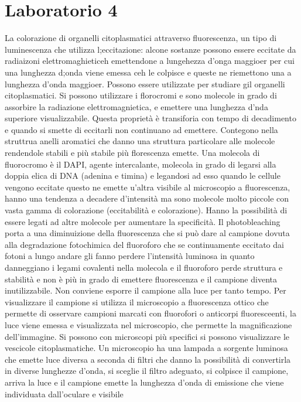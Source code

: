 \section{Laboratorio 4}
La colorazione di organelli citoplasmatici attraverso fluorescenza, un tipo di luminescenza che utilizza l;eccitazione: alcone sostanze possono essere eccitate da radiaizoni 
elettromaghieticeh emettendone a lungehezza d'onga maggioer per cui una lunghezza d;onda viene emessa ceh le colpisce e queste ne riemettono una a lunghezza d'onda maggioer. Possono
essere utilizzate per studiare gil organelli citoplasmatici. Si possono utilizzare i florocromi e sono molecole in grado di assorbire la radiazione elettromagnietica, e emettere una
lunghezza d'nda superiore visualizzabile. Questa propriet\`a \`e transiforia con tempo di decadimento e quando si smette di eccitarli non continuano ad emettere. Contegono nella
struttrua anelli aromatici che danno una struttura particolare alle molecole rendendole stabili e pi\`u stabile pi\`u florescenza emette. Una molecola di fluorocromo \`e il DAPI, agente
intercalante, molecola in grado di legarsi alla doppia elica di DNA (adenina e timina) e legandosi ad esso quando le cellule vengono eccitate questo ne emette u'altra visibile al 
microscopio a fluorescenza, hanno una tendenza a decadere d'intensit\`a ma sono molecole molto piccole con vasta gamma di colorazione (eccitabilit\`a e colorazione). Hanno la 
possibilit\`a di essere legati ad altre molecole per aumentare la specificit\`a. Il photobleaching porta a  una diminuizione della fluorescenza che si pu\`o dare al campione dovuta 
alla degradazione fotochimica del fluoroforo che se continuamente eccitato dai fotoni a lungo andare gli fanno perdere l'intensit\`a luminosa in quanto danneggiano i legami 
covalenti nella molecola e il fluoroforo perde struttura e stabilit\`a e non \`e pi\`u in grado di emettere fluorescenza e il campione diventa inutilizzabile. Non conviene esporre il 
campione alla luce per tanto tempo. Per visualizzare il campione si utilizza il microscopio a fluorescenza ottico che permette di osservare campioni marcati con fluorofori o anticorpi 
fluoresceenti, la luce viene emessa e visualizzata nel microscopio, che permette la magnificazione dell'immagine. Si possono con microscopi pi\`u specifici si possono visualizzare le
vescicole citoplasmatiche. Un microscopio ha una lampada a sorgente luminosa che emette luce diversa a seconda di filtri che danno la possibilit\`a di convertirla in diverse lunghezze
d'onda, si sceglie il filtro adeguato, si colpisce il campione, arriva la luce e il campione emette la lunghezza d'onda di emissione che viene individuata dall'oculare e visibile
